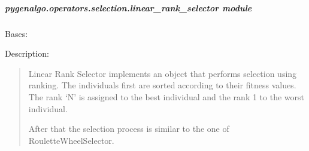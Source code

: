 \documentclass[letterpaper,10pt,english]{sphinxmanual}
\begin{document}
\subparagraph{pygenalgo.operators.selection.linear\_rank\_selector module}
\label{\detokenize{pygenalgo.operators.selection:module-pygenalgo.operators.selection.linear_rank_selector}}\label{\detokenize{pygenalgo.operators.selection:pygenalgo-operators-selection-linear-rank-selector-module}}

\begin{fulllineitems}
\label{\detokenize{pygenalgo.operators.selection:pygenalgo.operators.selection.linear_rank_selector.LinearRankSelector}}
\pysigstartsignatures
{}
\pysigstopsignatures
\sphinxAtStartPar
Bases: {\hyperref[\detokenize{pygenalgo.operators.selection:pygenalgo.operators.selection.select_operator.SelectionOperator}]{}}

\sphinxAtStartPar
Description:
\begin{quote}

\sphinxAtStartPar
Linear Rank Selector implements an object that performs selection using ranking.
The individuals first are sorted according to their fitness values. The rank ‘N’
is assigned to the best individual and the rank 1 to the worst individual.

\sphinxAtStartPar
After that the selection process is similar to the one of RouletteWheelSelector.
\end{quote}


\end{fulllineitems}
\end{document}
